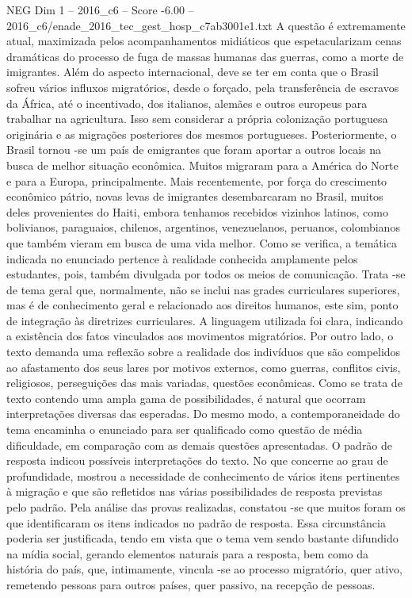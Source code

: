 \begin{textsample}{NEG Dim 1 – 2016\_c6 – Score -6.00 – 2016\_c6/enade\_2016\_tec\_gest\_hosp\_c7ab3001e1.txt}
A questão é extremamente atual, maximizada pelos acompanhamentos midiáticos que espetacularizam cenas dramáticas do processo de fuga de massas humanas das guerras, como a morte de imigrantes.
Além do aspecto internacional, deve se ter em conta que o Brasil sofreu vários influxos migratórios, desde o forçado, pela transferência de escravos da África, até o incentivado, dos italianos, alemães e outros europeus para trabalhar na agricultura.
Isso sem considerar a própria colonização portuguesa originária e as migrações posteriores dos mesmos portugueses.
Posteriormente, o Brasil tornou -se um país de emigrantes que foram aportar a outros locais na busca de melhor situação econômica.
Muitos migraram para a América do Norte e para a Europa, principalmente.
Mais recentemente, por força do crescimento econômico pátrio, novas levas de imigrantes desembarcaram no Brasil, muitos deles provenientes do Haiti, embora tenhamos recebidos vizinhos latinos, como bolivianos, paraguaios, chilenos, argentinos, venezuelanos, peruanos, colombianos que também vieram em busca de uma vida melhor.
Como se verifica, a temática indicada no enunciado pertence à realidade conhecida amplamente pelos estudantes, pois, também divulgada por todos os meios de comunicação.
Trata -se de tema geral que, normalmente, não se inclui nas grades curriculares superiores, mas é de conhecimento geral e relacionado aos direitos humanos, este sim, ponto de integração às diretrizes curriculares.
A linguagem utilizada foi clara, indicando a existência dos fatos vinculados aos movimentos migratórios.
Por outro lado, o texto demanda uma reflexão sobre a realidade dos indivíduos que são compelidos ao afastamento dos seus lares por motivos externos, como guerras, conflitos civis, religiosos, perseguições das mais variadas, questões econômicas.
Como se trata de texto contendo uma ampla gama de possibilidades, é natural que ocorram interpretações diversas das esperadas.
Do mesmo modo, a contemporaneidade do tema encaminha o enunciado para ser qualificado como questão de média dificuldade, em comparação com as demais questões apresentadas.
O padrão de resposta indicou possíveis interpretações do texto.
No que concerne ao grau de profundidade, mostrou a necessidade de conhecimento de vários itens pertinentes à migração e que são refletidos nas várias possibilidades de resposta previstas pelo padrão.
Pela análise das provas realizadas, constatou -se que muitos foram os que identificaram os itens indicados no padrão de resposta.
Essa circunstância poderia ser justificada, tendo em vista que o tema vem sendo bastante difundido na mídia social, gerando elementos naturais para a resposta, bem como da história do país, que, intimamente, vincula -se ao processo migratório, quer ativo, remetendo pessoas para outros países, quer passivo, na recepção de pessoas.

\end{textsample}
